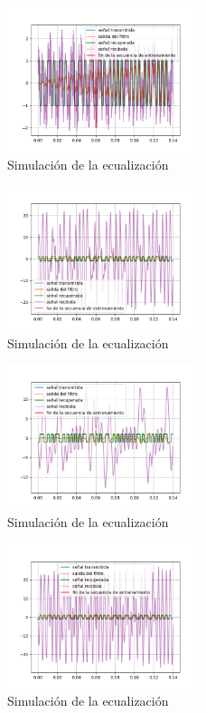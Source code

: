 \documentclass[main.tex]{subfiles}
\begin{document}
\begin{figure}[hp]
	\centering
	\includegraphics[width=0.5\textwidth]{imagenes/out6.png}
	\caption{Simulaci\'on de la ecualizaci\'on}
\end{figure}



\begin{figure}[hp]
	\centering
	\includegraphics[width=0.5\textwidth]{imagenes/out11.png}
	\caption{Simulaci\'on de la ecualizaci\'on}
\end{figure}


\begin{figure}[hp]
	\centering
	\includegraphics[width=0.5\textwidth]{imagenes/out12.png}
	\caption{Simulaci\'on de la ecualizaci\'on}
\end{figure}

\begin{figure}[hp]
	\centering
	\includegraphics[width=0.5\textwidth]{imagenes/out13.png}
	\caption{Simulaci\'on de la ecualizaci\'on}
	\label{fig:outf}
\end{figure}
\end{document}
